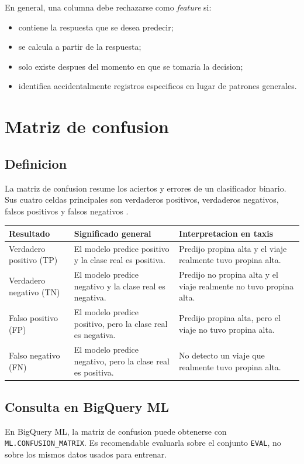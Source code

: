 \documentclass[12pt]{article}
\begin{document}
En general, una columna debe rechazarse como \textit{feature} si:
\begin{itemize}[leftmargin=*]
\item contiene la respuesta que se desea predecir;
\item se calcula a partir de la respuesta;
\item solo existe despues del momento en que se tomaria la decision;
\item identifica accidentalmente registros especificos en lugar de patrones generales.
\end{itemize}

\section{Matriz de confusion}
\subsection{Definicion}
La matriz de confusion resume los aciertos y errores de un clasificador binario. Sus cuatro celdas principales son verdaderos positivos, verdaderos negativos, falsos positivos y falsos negativos \cite{gcp_confusion_matrix,google_class_metrics}.

\begin{longtable}{p{} p{} p{}}
\toprule
\textbf{Resultado} & \textbf{Significado general} & \textbf{Interpretacion en taxis} \\
\midrule
\endhead
Verdadero positivo (TP) & El modelo predice positivo y la clase real es positiva. & Predijo propina alta y el viaje realmente tuvo propina alta. \\
Verdadero negativo (TN) & El modelo predice negativo y la clase real es negativa. & Predijo no propina alta y el viaje realmente no tuvo propina alta. \\
Falso positivo (FP) & El modelo predice positivo, pero la clase real es negativa. & Predijo propina alta, pero el viaje no tuvo propina alta. \\
Falso negativo (FN) & El modelo predice negativo, pero la clase real es positiva. & No detecto un viaje que realmente tuvo propina alta. \\
\bottomrule
\end{longtable}

\subsection{Consulta en BigQuery ML}
En BigQuery ML, la matriz de confusion puede obtenerse con \texttt{ML.CONFUSION\_MATRIX}. Es recomendable evaluarla sobre el conjunto \texttt{EVAL}, no sobre los mismos datos usados para entrenar.
\end{document}
